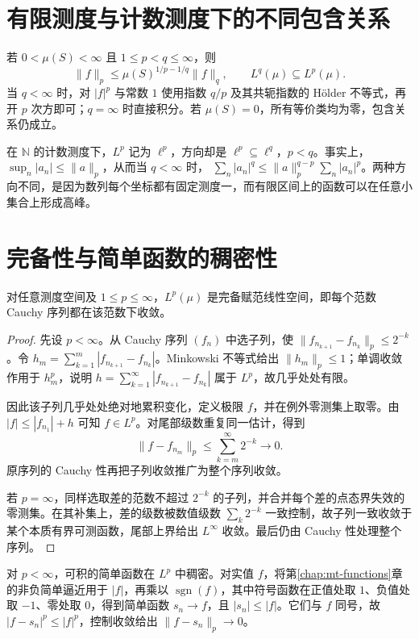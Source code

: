 \documentclass[UTF8,12pt,a4paper,fontset=fandol]{ctexbook}
\begin{document}
\section{有限测度与计数测度下的不同包含关系}
若 $0<\mu(S)<\infty$ 且 $1\leq p<q\leq\infty$，则
\begin{equation}
 \|f\|_p\leq\mu(S)^{1/p-1/q}\|f\|_q,\qquad L^q(\mu)\subseteq L^p(\mu).
 \label{eq:mt-finite-embedding}
\end{equation}
当 $q<\infty$ 时，对 $|f|^p$ 与常数 $1$ 使用指数 $q/p$ 及其共轭指数的 Hölder 不等式，再开 $p$ 次方即可；$q=\infty$ 时直接积分。若 $\mu(S)=0$，所有等价类均为零，包含关系仍成立。

在 $\mathbb N$ 的计数测度下，$L^p$ 记为 $\ell^p$，方向却是 $\ell^p\subseteq\ell^q$，$p<q$。事实上，$\sup_n|a_n|\leq\|a\|_p$，从而当 $q<\infty$ 时，
$\sum_n|a_n|^q\leq\|a\|_p^{q-p}\sum_n|a_n|^p$。两种方向不同，是因为数列每个坐标都有固定测度一，而有限区间上的函数可以在任意小集合上形成高峰。

\section{完备性与简单函数的稠密性}
\begin{theorem}[$L^p$ 的完备性]
对任意测度空间及 $1\leq p\leq\infty$，$L^p(\mu)$ 是完备赋范线性空间，即每个范数 Cauchy 序列都在该范数下收敛。
\label{thm:mt-lp-complete}
\end{theorem}
\begin{proof}
先设 $p<\infty$。从 Cauchy 序列 $(f_n)$ 中选子列，使 $\|f_{n_{k+1}}-f_{n_k}\|_p\leq2^{-k}$。令
$h_m=\sum_{k=1}^{m}|f_{n_{k+1}}-f_{n_k}|$。Minkowski 不等式给出 $\|h_m\|_p\leq1$；单调收敛作用于 $h_m^p$，说明 $h=\sum_{k=1}^{\infty}|f_{n_{k+1}}-f_{n_k}|$ 属于 $L^p$，故几乎处处有限。

因此该子列几乎处处绝对地累积变化，定义极限 $f$，并在例外零测集上取零。由 $|f|\leq|f_{n_1}|+h$ 可知 $f\in L^p$。对尾部级数重复同一估计，得到
\[
 \|f-f_{n_m}\|_p\leq\sum_{k=m}^{\infty}2^{-k}\longrightarrow0.
\]
原序列的 Cauchy 性再把子列收敛推广为整个序列收敛。

若 $p=\infty$，同样选取差的范数不超过 $2^{-k}$ 的子列，并合并每个差的点态界失效的零测集。在其补集上，差的级数被数值级数 $\sum_k2^{-k}$ 一致控制，故子列一致收敛于某个本质有界可测函数，尾部上界给出 $L^\infty$ 收敛。最后仍由 Cauchy 性处理整个序列。
\end{proof}

对 $p<\infty$，可积的简单函数在 $L^p$ 中稠密。对实值 $f$，将第\ref{chap:mt-functions}章的非负简单逼近用于 $|f|$，再乘以 $\operatorname{sgn}(f)$，其中符号函数在正值处取 $1$、负值处取 $-1$、零处取 $0$，得到简单函数 $s_n\to f$，且 $|s_n|\leq|f|$。它们与 $f$ 同号，故 $|f-s_n|^p\leq|f|^p$，控制收敛给出 $\|f-s_n\|_p\to0$。
\end{document}
